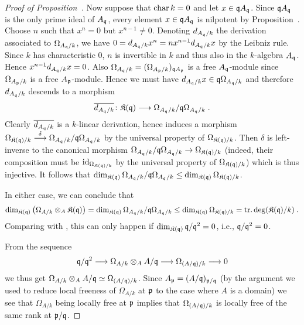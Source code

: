 \documentclass[a4paper,parskip=half,numbers=enddot, DIV=12, headheight=30pt]{scrreprt}
\begin{document}
\begin{proof}[Proof of Proposition~]
	Now suppose that $\operatorname{char} k=0$ and let $x\in \mathfrak{q} A_{\mathfrak{q}}$. Since $\mathfrak{q} A_{\mathfrak{q}}$ is the only prime ideal of $A_{\mathfrak{q}}$, every element $x\in \mathfrak{q} A_{\mathfrak{q}}$ is nilpotent by Proposition~. Choose $n$ such that $x^n=0$ but $x^{n-1}\neq 0$. Denoting $d_{A_{\mathfrak{q}}/k}$ the derivation associated to $\Omega_{A_{\mathfrak{q}}/k}$, we have $0=d_{A_{\mathfrak{q}}/k}x^n=nx^{n-1}d_{A_{\mathfrak{q}}/k}x$ by the Leibniz rule. Since $k$ has characteristic $0$, $n$ is invertible in $k$ and thus also in the $k$-algebra $A_{\mathfrak{q}}$. Hence $x^{n-1}d_{A_{\mathfrak{q}}/k}x=0$. Also $\Omega_{A_{\mathfrak{q}}/k}=(\Omega_{A_{\mathfrak{p}}/k})_{\mathfrak{q} A_{\mathfrak{p}}}$ is a free $A_{\mathfrak{q}}$-module since $\Omega_{A_{\mathfrak{p}}/k}$ is a free $A_{\mathfrak{p}}$-module. Hence we must have $d_{A_{\mathfrak{q}}/k}x\in \mathfrak{q}\Omega_{A_{\mathfrak{q}}/k}$ and therefore $d_{A_{\mathfrak{q}}/k}$ descends to a morphism
	\begin{align*}
		\ov{d_{A_\qq/k}}\colon \KK(\qq)\morphism \Omega_{A_\qq/k}/\qq\Omega_{A_\qq/k}\;.
	\end{align*}
	Clearly $	\overline{d_{A_{\mathfrak{q}}/k}}$ is a $k$-linear derivation, hence induces a morphism $\Omega_{\KK(\qq)/k}\morphism[\delta] \Omega_{A_\qq/k}/\qq\Omega_{A_\qq/k}$ by the universal property of $\Omega_{\mathfrak{K}(\mathfrak{q})/k}$. Then $\delta$ is left-inverse to the canonical morphism $\Omega_{A_\qq/k}/\qq\Omega_{A_\qq/k}\morphism \Omega_{\KK(\qq)/k}$ (indeed, their composition must be $\operatorname{id}_{\Omega_{\mathfrak{K}(\mathfrak{q})/k}}$ by the universal property of $\Omega_{\mathfrak{K}(\mathfrak{q})/k}$) which is thus injective. It follows that $\dim_{\mathfrak{K}(\mathfrak{q})}\Omega_{A_{\mathfrak{q}}/k}/\mathfrak{q}\Omega_{A_{\mathfrak{q}}/k}\leq \dim_{\mathfrak{K}(\mathfrak{q})}\Omega_{\mathfrak{K}(\mathfrak{q})/k}$.
	
	In either case, we can conclude that
	\begin{align*}
		\dim_{\mathfrak{K}(\mathfrak{q})}\left(\Omega_{A/k}\otimes_A\mathfrak{K}(\mathfrak{q})\right)=\dim_{\mathfrak{K}(\mathfrak{q})}\Omega_{A_{\mathfrak{q}}/k}/\mathfrak{q}\Omega_{A_{\mathfrak{q}}/k}\leq \dim_{\mathfrak{K}(\mathfrak{q})}\Omega_{\mathfrak{K}(\mathfrak{q})/k}=\operatorname{tr.deg}(\mathfrak{K}(\mathfrak{q})/k)\;.
	\end{align*}
	Comparing with , this can only happen if $\dim_{\mathfrak{K}(\mathfrak{q})}\mathfrak{q}/\mathfrak{q}^2=0$, i.e., $\mathfrak{q}/\mathfrak{q}^2=0$.
	
	From the sequence
	\begin{align*}
		\qq/\qq^2\morphism \Omega_{A/k}\otimes_A A/\qq\morphism\Omega_{(A/\qq)/k}\morphism 0
	\end{align*}
	we thus get $\Omega_{A/k}\otimes_A A/\mathfrak{q}\simeq\Omega_{(A/\mathfrak{q})/k}$. Since $A_{\mathfrak{p}}=(A/\mathfrak{q})_{\mathfrak{p}/\mathfrak{q}}$ (by the argument we used to reduce local freeness of $\Omega_{A/k}$ at $\mathfrak{p}$ to the case where $A$ is a domain) we see that $\Omega_{A/k}$ being locally free at $\mathfrak{p}$ implies that $\Omega_{(A/\mathfrak{q})/k}$ is locally free of the same rank at $\mathfrak{p}/\mathfrak{q}$.
	

\end{proof}
\end{document}
